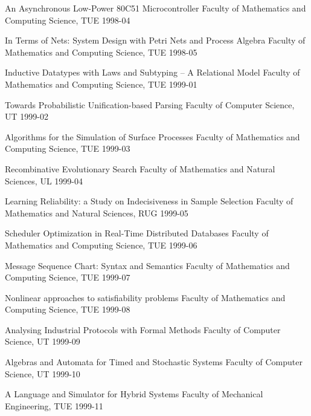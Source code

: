 \begin{multicols}{2}
         {An Asynchronous Low-Power 80C51 Microcontroller}
         {Faculty of Mathematics and Computing Science, TUE}
         {1998-04}      

         {In Terms of Nets: System Design with Petri Nets and Process 
Algebra}
         {Faculty of Mathematics and Computing Science, TUE}
         {1998-05}      

         {Inductive Datatypes with Laws and Subtyping -- A Relational 
Model}
         {Faculty of Mathematics and Computing Science, TUE}
         {1999-01}      

         {Towards Probabilistic Unification-based Parsing}
         {Faculty of Computer Science, UT}
         {1999-02}      

         {Algorithms for the Simulation of Surface Processes}
         {Faculty of Mathematics and Computing Science, TUE}
         {1999-03}      

         {Recombinative Evolutionary Search}
         {Faculty of Mathematics and Natural Sciences, UL}
         {1999-04}

         {Learning Reliability: a Study on Indecisiveness in Sample 
Selection}
         {Faculty of Mathematics and Natural Sciences, RUG}
         {1999-05}

         {Scheduler Optimization in Real-Time Distributed Databases}
         {Faculty of Mathematics and Computing Science, TUE}
         {1999-06}

         {Message Sequence Chart: Syntax and Semantics}
         {Faculty of Mathematics and Computing Science, TUE}
         {1999-07}

         {Nonlinear approaches to satisfiability problems}
         {Faculty of Mathematics and Computing Science, TUE}
         {1999-08}

         {Analysing Industrial Protocols with Formal Methods}
         {Faculty of Computer Science, UT}
         {1999-09}

         {Algebras and Automata for Timed and Stochastic Systems}
         {Faculty of Computer Science, UT}
         {1999-10}



         {A Language and Simulator for Hybrid Systems}
         {Faculty of Mechanical Engineering, TUE}
         {1999-11}



\end{multicols}
